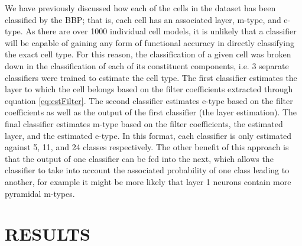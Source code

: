 \documentclass[letterpaper, 10 pt, conference]{ieeeconf}  %
\begin{document}
We have previously discussed how each of the cells in the dataset has been classified by the BBP; that is, each cell has an associated layer, m-type, and e-type. As there are over 1000 individual cell models, it is unlikely that a classifier will be capable of gaining any form of functional accuracy in directly classifying the exact cell type. For this reason, the classification of a given cell was broken down in the classification of each of its constituent components, i.e. 3 separate classifiers were trained to estimate the cell type. The first classifier estimates the layer to which the cell belongs based on the filter coefficients extracted through equation \ref{eq:estFilter}. The second classifier estimates e-type based on the filter coefficients as well as the output of the first classifier (the layer estimation). The final classifier estimates m-type based on the filter coefficients, the estimated layer, and the estimated e-type. In this format, each classifier is only estimated against 5, 11, and 24 classes respectively. The other benefit of this approach is that the output of one classifier can be fed into the next, which allows the classifier to take into account the associated probability of one class leading to another, for example it might be more likely that layer 1 neurons contain more pyramidal m-types.\\


\section{RESULTS}
\end{document}
